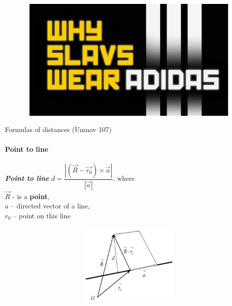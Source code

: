 \documentclass[aspectratio=169]{beamer}
\begin{document}
\begin{frame}[t]{}
    \begin{figure}[H]
        \href{http://www.youtube.com/watch?v=5-l-OkR5yDk}{
            \centering\includegraphics[height=6cm,width=1\textwidth,keepaspectratio]{slav_adidas.jpg}}
        \label{fig:slav_adidas.jpg}
    \end{figure}
\end{frame}

\begin{frame}[t]{Formulas of distances (Umnov 107)}
    \framesubtitle{Point to line}
    \begin{minipage}{0.6\textwidth}
        \textbf{\textit{Point to line}} $d = \dfrac{\left|(\vec{R}-\vec{r_0}) \times \vec{a}\right| }{\left|\vec{a}\right|}$, where \\ $\vec{R}$ - is a \textbf{point},\\ $a$ -- directed vector of a line, \\ $r_0$ -- point on this line
    \end{minipage}
    \begin{minipage}{0.39\textwidth}
        \begin{figure}[H]
            \centering\includegraphics[height=4cm,width=1\textwidth,keepaspectratio]{distance_1.png}
            \label{fig:distance_1.png}
        \end{figure}
    \end{minipage}
\end{frame}
\end{document}
